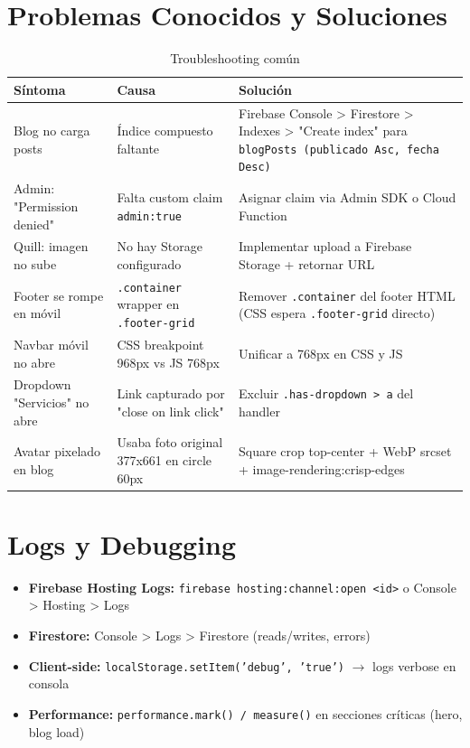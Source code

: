 \documentclass[12pt,a4paper,spanish]{report}
\begin{document}
\section{Problemas Conocidos y Soluciones}

\begin{table}[H]
    \centering
    \caption{Troubleshooting común}
    \label{tab:troubleshooting}
    \begin{tabular}{p{3cm}p{5cm}p{5cm}}
        \toprule
        \textbf{Síntoma} & \textbf{Causa} & \textbf{Solución} \\
        \midrule
        Blog no carga posts & Índice compuesto faltante & Firebase Console > Firestore > Indexes > "Create index" para \texttt{blogPosts (publicado Asc, fecha Desc)} \\
        Admin: "Permission denied" & Falta custom claim \texttt{admin:true} & Asignar claim via Admin SDK o Cloud Function \\
        Quill: imagen no sube & No hay Storage configurado & Implementar upload a Firebase Storage + retornar URL \\
        Footer se rompe en móvil & \texttt{.container} wrapper en \texttt{.footer-grid} & Remover \texttt{.container} del footer HTML (CSS espera \texttt{.footer-grid} directo) \\
        Navbar móvil no abre & CSS breakpoint 968px vs JS 768px & Unificar a 768px en CSS y JS \\
        Dropdown "Servicios" no abre & Link capturado por "close on link click" & Excluir \texttt{.has-dropdown > a} del handler \\
        Avatar pixelado en blog & Usaba foto original 377x661 en circle 60px & Square crop top-center + WebP srcset + image-rendering:crisp-edges \\
        \bottomrule
    \end{tabular}
\end{table}

\section{Logs y Debugging}
\begin{itemize}
    \item \textbf{Firebase Hosting Logs:} \texttt{firebase hosting:channel:open <id>} o Console > Hosting > Logs
    \item \textbf{Firestore:} Console > Logs > Firestore (reads/writes, errors)
    \item \textbf{Client-side:} \texttt{localStorage.setItem('debug', 'true')} $\rightarrow$ logs verbose en consola
    \item \textbf{Performance:} \texttt{performance.mark() / measure()} en secciones críticas (hero, blog load)
\end{itemize}
\end{document}
